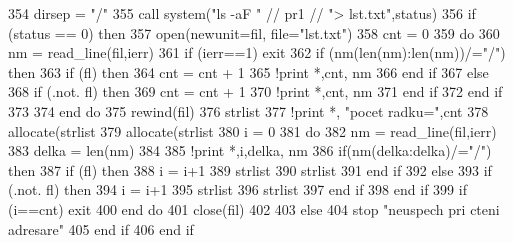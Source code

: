 \begin{DoxyCode}
354             dirsep = \textcolor{stringliteral}{"/"}
355             \textcolor{keyword}{call }system(\textcolor{stringliteral}{"ls -aF "} // pr1 // \textcolor{stringliteral}{"> lst.txt"},status)
356             \textcolor{keywordflow}{if} (status == 0) then
357                 \textcolor{keyword}{open}(newunit=fil, file=\textcolor{stringliteral}{"lst.txt"})
358                 cnt = 0
359                 do
360                     nm = read_line(fil,ierr)
361                     \textcolor{keywordflow}{if} (ierr==1) exit
362                     \textcolor{keywordflow}{if} (nm(len(nm):len(nm))/=\textcolor{stringliteral}{"/"}) then
363                         \textcolor{keywordflow}{if} (fl) then
364                             cnt = cnt + 1
365                             \textcolor{comment}{!print *,cnt, nm
}
366 \textcolor{keyword}{                        end }if
367                     else
368                         \textcolor{keywordflow}{if} (.not. fl) then
369                             cnt = cnt + 1
370                             \textcolor{comment}{!print *,cnt, nm
}
371 \textcolor{keyword}{                        end }if
372 \textcolor{keyword}{                    end }if
373 
374 \textcolor{keyword}{                end }do
375                 rewind(fil)
376                 strlist%
377                 \textcolor{comment}{!print *, "pocet radku=",cnt
}
378                 \textcolor{keyword}{allocate}(strlist%
379                 \textcolor{keyword}{allocate}(strlist%
380                 i = 0
381                 do
382                     nm = read_line(fil,ierr)
383                     delka = len(nm)
384 
385                     \textcolor{comment}{!print *,i,delka, nm
}
386                     \textcolor{keywordflow}{if}(nm(delka:delka)/=\textcolor{stringliteral}{"/"}) then
387                         \textcolor{keywordflow}{if} (fl) then
388                             i = i+1
389                             strlist%
390                             strlist%
391 \textcolor{keyword}{                        end }if
392                     else
393                         \textcolor{keywordflow}{if} (.not. fl) then
394                             i = i+1
395                             strlist%
396                             strlist%
397 \textcolor{keyword}{                        end }if
398 \textcolor{keyword}{                    end }if
399                     \textcolor{keywordflow}{if} (i==cnt) exit
400 \textcolor{keyword}{                end }do
401                 \textcolor{keyword}{close}(fil)
402 
403             else
404                 stop \textcolor{stringliteral}{"neuspech pri cteni adresare"}
405 \textcolor{keyword}{            end }if
406 \textcolor{keyword}{        end }if
\end{DoxyCode}


